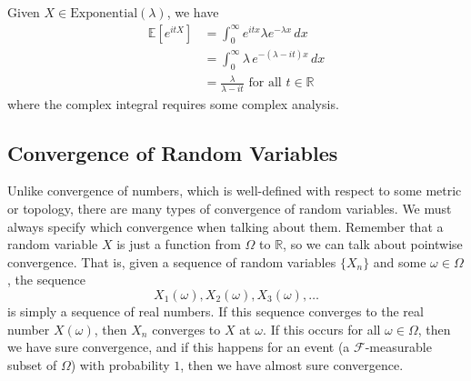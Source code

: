 \documentclass{article}
\begin{document}
      \begin{example}[Exponential]
        Given $X \in \mathrm{Exponential}(\lambda)$, we have 
        \begin{align*}
          \mathbb{E}[e^{i t X}] & = \int_0^\infty e^{i t x} \lambda e^{-\lambda x} \,dx \\
          & = \int_0^\infty \lambda \, e^{-(\lambda - i t) x} \,dx \\
          & = \frac{\lambda}{\lambda - it} \text{ for all } t \in \mathbb{R}
        \end{align*}
        where the complex integral requires some complex analysis. 
      \end{example}

  \subsection{Convergence of Random Variables}

    Unlike convergence of numbers, which is well-defined with respect to some metric or topology, there are many types of convergence of random variables. We must always specify which convergence when talking about them. Remember that a random variable $X$ is just a function from $\Omega$ to $\mathbb{R}$, so we can talk about pointwise convergence. That is, given a sequence of random variables $\{X_n\}$ and some $\omega \in \Omega$, the sequence 
    \begin{equation}
      X_1(\omega), X_2 (\omega), X_3(\omega), \ldots
    \end{equation}
    is simply a sequence of real numbers. If this sequence converges to the real number $X(\omega)$, then $X_n$ converges to $X$ at $\omega$. If this occurs for all $\omega \in \Omega$, then we have sure convergence, and if this happens for an event (a $\mathcal{F}$-measurable subset of $\Omega$) with probability $1$, then we have almost sure convergence. 
\end{document}

